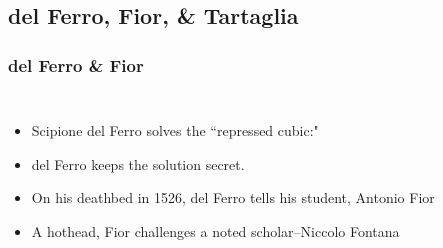 \documentclass{beamer}
\begin{document}
\subsection{del Ferro, Fior, \& Tartaglia}
\begin{frame}
\frametitle{del Ferro \& Fior}

\begin{columns}
\begin{itemize}
    \item
    Scipione del Ferro solves the ``repressed cubic:"

    \item
    del Ferro keeps the solution secret.

    \item On his deathbed in 1526, del Ferro tells his student, Antonio
    Fior

    \item A hothead, Fior challenges a noted scholar--Niccolo Fontana
\end{itemize}

\end{columns}
\end{frame}

\end{document}
